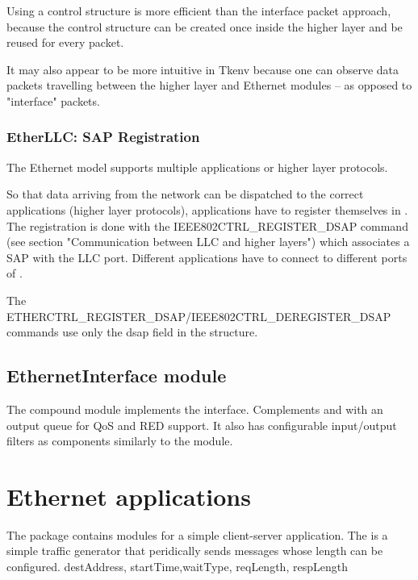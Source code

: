 Using a control structure is more efficient than the interface packet
approach, because the control structure can be created once inside
the higher layer and be reused for every packet.

It may also appear to be more intuitive in Tkenv because one can observe
data packets travelling between the higher layer and Ethernet
modules -- as opposed to "interface" packets.


\subsubsection{EtherLLC: SAP Registration}

The Ethernet model supports multiple applications or higher layer
protocols.

So that data arriving from the network can be dispatched to the
correct applications (higher layer protocols), applications
have to register themselves in . The registration
is done with the IEEE802CTRL\_REGISTER\_DSAP command
(see section "Communication between LLC and higher layers")
which associates a SAP with the LLC port. Different applications
have to connect to different ports of .

The ETHERCTRL\_REGISTER\_DSAP/IEEE802CTRL\_DEREGISTER\_DSAP commands use only the
dsap field in the  structure.

\subsection{EthernetInterface module}

The  compound module implements the 
interface. Complements  and  with an output queue
for QoS and RED support. It also has configurable input/output filters as 
components similarly to the  module.


\section{Ethernet applications}

The  package contains modules
for a simple client-server application. The  is a simple
traffic generator that peridically sends  messages
whose length can be configured. destAddress, startTime,waitType, reqLength, respLength

